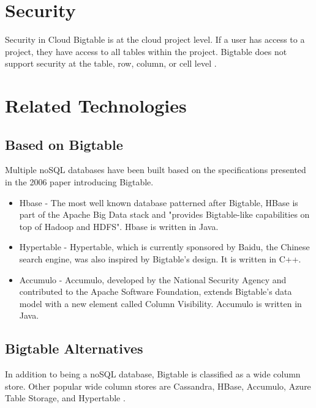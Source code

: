 \documentclass[9pt,twocolumn,twoside]{styles/osajnl}
\begin{document}
\section{Security}

Security in Cloud Bigtable is at the cloud project level. If a user has access to a project, they have access to all tables within the project. Bigtable does not support security at the table, row, column, or cell level \cite{www-bigtabledocoverview}.

\section{Related Technologies}

\subsection{Based on Bigtable}

Multiple noSQL databases have been built based on the specifications presented in the 2006 paper introducing Bigtable.


\vspace{-\topsep}
\begin{itemize}
\item Hbase \cite{www-hbase} - The most well known database patterned after Bigtable, HBase is part of the Apache Big Data stack and "provides Bigtable-like capabilities on top of Hadoop and HDFS"\cite{www-hbase}.  Hbase is written in Java.
\item Hypertable \cite{www-wikihypertable} - Hypertable, which is currently sponsored by Baidu, the Chinese search engine, was also inspired by Bigtable's design.  It is written in C++.
\item Accumulo \cite{www-wikiaccumulo} - Accumulo, developed by the National Security Agency and contributed to the Apache Software Foundation, extends Bigtable's data model with a new element called Column Visibility.  Accumulo is written in Java.
\end{itemize}
\vspace{-\topsep}

\subsection{Bigtable Alternatives}

In addition to being a noSQL database, Bigtable is classified as a wide column store.  Other popular wide column stores are Cassandra, HBase, Accumulo, Azure Table Storage, and Hypertable \cite{www-dbengineswide}.
\end{document}
